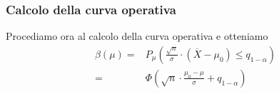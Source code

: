 \subsubsection{Calcolo della curva operativa}
Procediamo ora al calcolo della curva operativa e otteniamo
\begin{align*}
	\beta(\mu) = & P_\mu \left( \frac{\sqrt{n}}{\sigma} \cdot (\overline{X} - \mu_0) \leq
	q_{1-\alpha} \right)                                                                        \\
	=            & \Phi \left( \sqrt{n} \cdot \frac{\mu_0 - \mu}{\sigma} + q_{1-\alpha} \right)
\end{align*}